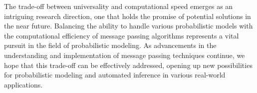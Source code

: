 The trade-off between universality and computational speed emerges as an intriguing research
direction, one that holds the promise of potential solutions in the near future.
Balancing the ability to handle various probabilistic models with the computational efficiency
of message passing algorithms represents a vital pursuit in the field of probabilistic
modeling.
As advancements in the understanding and implementation of message passing techniques
continue, we hope that this trade-off can be effectively addressed, opening up new
possibilities for probabilistic modeling and automated inference in various real-world
applications.

